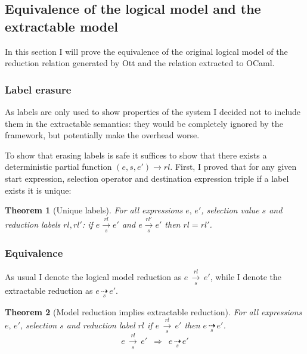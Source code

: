 \documentclass[12pt,twoside,notitlepage]{report}
\theoremstyle{plain}%
\newtheorem{thm}{Theorem}[section]
\theoremstyle{definition}
\theoremstyle{remark}
\begin{document}
\subsection{Equivalence of the logical model and the extractable model}
In this section I will prove the equivalence of the original logical model of the reduction relation generated by Ott and the relation extracted to OCaml.
\subsubsection{Label erasure}
As labels are only used to show properties of the system I decided not to include them in the extractable semantics: they would be completely ignored by the framework, but potentially make the overhead worse.

To show that erasing labels is safe it suffices to show that there exists a deterministic partial function $ (e,s,e') \rightarrow rl $. First, I proved that for any given start expression, selection operator and destination expression triple if a label exists it is unique:
\begin{thm}[Unique labels]
\label{thm:unique_label}
For all expressions $ e,\, e'$, selection value $ s $ and reduction labels $ rl, rl' $:
 if $ e \overset{rl}{\underset{s}{\longrightarrow}}e' $ and $ e \overset{rl'}{\underset{s}{\longrightarrow}}e' $ then $ rl = rl' $. 
\end{thm}
\subsubsection{Equivalence}
As usual I denote the logical model reduction as $ e\, \underset{s}{\overset{rl}{\longrightarrow}}\, e' $, while I denote the extractable reduction as $ e\, \underset{s}{\dashrightarrow}\, e' $.

\begin{thm}[Model reduction implies extractable reduction]
\label{thm:jo_to_xjo}
For all expressions $ e,\,e' $, selection $ s $ and reduction label $ rl $ if $ e\, \underset{s}{\overset{rl}{\longrightarrow}}\, e' $ then $  e\, \underset{s}{\dashrightarrow}\, e' $.
\[  e\, \underset{s}{\overset{rl}{\longrightarrow}}\, e' \,\,\,\Rightarrow \,\,\, e\, \underset{s}{\dashrightarrow}\, e' \]
\end{thm}
\end{document}

